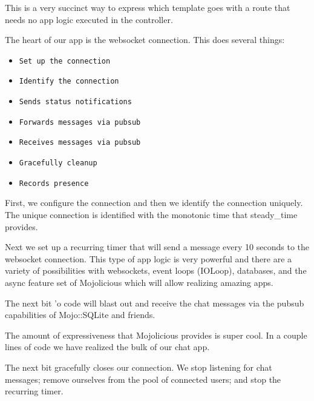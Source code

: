 \documentclass[14pt]{extreport}
\newcommand\Small{\fontsize{12}{13.0}\fontencoding{T1}\selectfont}
\newcommand*\LSTfont{\Small\ttfamily\SetTracking{encoding=*}{-60}\lsstyle}
\begin{document}
This is a very succinct way to express which template goes with a route that
needs no app logic executed in the controller.

The heart of our app is the websocket connection.  This does several things:

\begin{itemize} \itemsep1pt \parskip0pt 
\item \verb|Set up the connection|
\item \verb|Identify the connection|
\item \verb|Sends status notifications|
\item \verb|Forwards messages via pubsub|
\item \verb|Receives messages via pubsub|
\item \verb|Gracefully cleanup|
\item \verb|Records presence|
\end{itemize}

First, we configure the connection and then we identify the connection
uniquely.  The unique connection is identified with the monotonic time that
steady\_time provides.



Next we set up a recurring timer that will send a message every 10 seconds to
the websocket connection.  This type of app logic is very powerful and there
are a variety of possibilities with websockets, event loops (IOLoop),
databases, and the async feature set of Mojolicious which will allow realizing
amazing apps.



The next bit 'o code will blast out and receive the chat messages via the
pubsub capabilities of Mojo::SQLite and friends.



The amount of expressiveness that Mojolicious provides is super cool.  In a
couple lines of code we have realized the bulk of our chat app.



The next bit gracefully closes our connection.  We stop listening for chat
messages; remove ourselves from the pool of connected users; and stop the
recurring timer.
\end{document}
